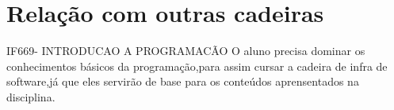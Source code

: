\documentclass{paper}
\begin{document}
\section{Relação com outras cadeiras}
IF669- INTRODUCAO A PROGRAMACÃO 
O aluno precisa dominar os conhecimentos básicos da programação,para assim cursar a cadeira de infra de software,já que eles servirão de base para os conteúdos aprensentados na disciplina.


\end{document}
